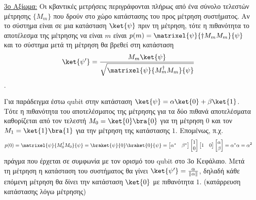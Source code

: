 \underline{3ο Αξίωμα:} Οι κβαντικές μετρήσεις περιγράφονται πλήρως από ένα σύνολο τελεστών μέτρησης $\{M_m\}$ που δρούν στο χώρο κατάστασης του προς μέτρηση συστήματος. Αν το σύστημα είναι σε μια κατάσταση $\ket{\psi}$ πριν τη μέτρηση, τότε η πιθανότητα το αποτέλεσμα της μέτρησης να είναι $m$ είναι $p(m) = \matrixel{\psi}{\dagger{M_m}M_m}{\psi}$ και το σύστημα μετά τη μέτρηση θα βρεθεί στη κατάσταση \[\ket{\psi'} = \frac{M_m\ket{\psi}}{\sqrt{\matrixel{\psi}{M_m^{\dagger{}}M_m}{\psi}}}\].

Για παράδειγμα έστω qubit στην κατάσταση $\ket{\psi} = \alpha\ket{0} + \beta\ket{1}$. Τότε η πιθανότητα του αποτελέσματος της μέτρησης για τα δύο πιθανά αποτελέσματα καθορίζεται από τον τελεστή $M_0 = \ket{0}\bra{0}$ για τη μέτρηση $0$ και τον $M_1 = \ket{1}\bra{1}$ για την μέτρηση της κατάστασης $1$. Επομένως, π.χ. \[p(0) = \matrixel{\psi}{M_0^{\dagger{}}M_0}{\psi} = \braket{\psi}{0}\braket{0}{\psi} =  \begin{bmatrix}\alpha^{*}&\beta^{*}\end{bmatrix} \begin{bmatrix}1\\0\end{bmatrix} \begin{bmatrix}1&0\end{bmatrix} \begin{bmatrix}\alpha\\\beta\end{bmatrix} = \alpha^{*}\alpha = \alpha^2\] 
πράγμα που έρχεται σε συμφωνία με τον ορισμό του qubit στο 3ο Κεφάλαιο. Μετά τη μέτρηση η κατάσταση του συστήματος θα γίνει $\ket{\psi'} = \frac{\alpha}{\|\alpha\|}$, δηλαδή κάθε επόμενη μέτρηση θα δίνει την κατάσταση $\ket{0}$ με πιθανότητα $1$. (κατάρρευση κατάστασης λόγω μέτρησης)
